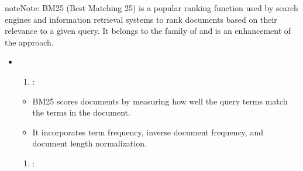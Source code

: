 \documentclass[letterpaper,11pt,english]{sphinxmanual}
\begin{document}
\begin{sphinxadmonition}{note}{Note:}
\sphinxAtStartPar
BM25 (Best Matching 25) is a popular ranking function used by search engines
and information retrieval systems to rank documents based on their relevance
to a given query. It belongs to the family of 
and is an enhancement of the  approach.
\begin{itemize}
\item {} 
\sphinxAtStartPar
{}
\begin{enumerate}
%
\item {} 
\sphinxAtStartPar
{}:

\end{enumerate}
\begin{itemize}
\item {} 
\sphinxAtStartPar
BM25 scores documents by measuring how well the query terms match the terms in the document.

\item {} 
\sphinxAtStartPar
It incorporates term frequency, inverse document frequency, and document length normalization.

\end{itemize}
\begin{enumerate}
%
\setcounter{enumi}{1}
\item {} 
\sphinxAtStartPar
{}:

\end{enumerate}
\begin{quote}


\end{quote}
\end{itemize}
\end{sphinxadmonition}
\end{document}
